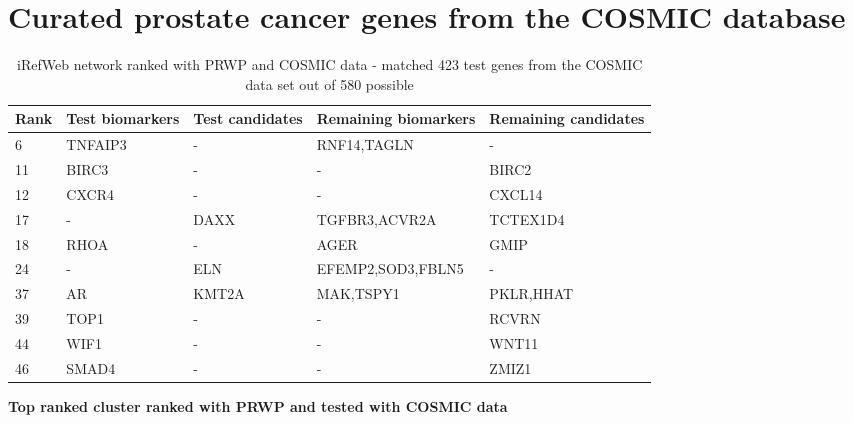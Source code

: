 \section{Curated prostate cancer genes from the COSMIC database}
\begin{sidewaystable}
    \begin{tabular}{|l|l|l|l|l|}
        \hline
        \textbf{Rank}
        & \textbf{Test biomarkers}
        & \textbf{Test candidates}
        & \textbf{Remaining biomarkers}
        & \textbf{Remaining candidates} \\
        \hline
        6	& TNFAIP3	& -	& RNF14,TAGLN	& - \\
        \hline
        11	& BIRC3	& -	& -	& BIRC2 \\
        \hline
        12	& CXCR4	& -	& -	& CXCL14 \\
        \hline
        17	& -	& DAXX	& TGFBR3,ACVR2A	& TCTEX1D4 \\
        \hline
        18	& RHOA	& -	& AGER	& GMIP \\
        \hline
        24	& -	& ELN	& EFEMP2,SOD3,FBLN5	& - \\
        \hline
        37	& AR	& KMT2A	& MAK,TSPY1	& PKLR,HHAT \\
        \hline
        39	& TOP1	& -	& -	& RCVRN \\
        \hline
        44	& WIF1	& -	& -	& WNT11 \\
        \hline
        46	& SMAD4	& -	& -	& ZMIZ1 \\
        \hline
    \end{tabular}
    \caption{iRefWeb network ranked with PRWP and COSMIC data - matched 423 test
    genes from the COSMIC data set out of 580 possible}
    \label{tab:prwp-cosmic}
\end{sidewaystable}

\textbf{Top ranked cluster ranked with PRWP and tested with COSMIC data}

